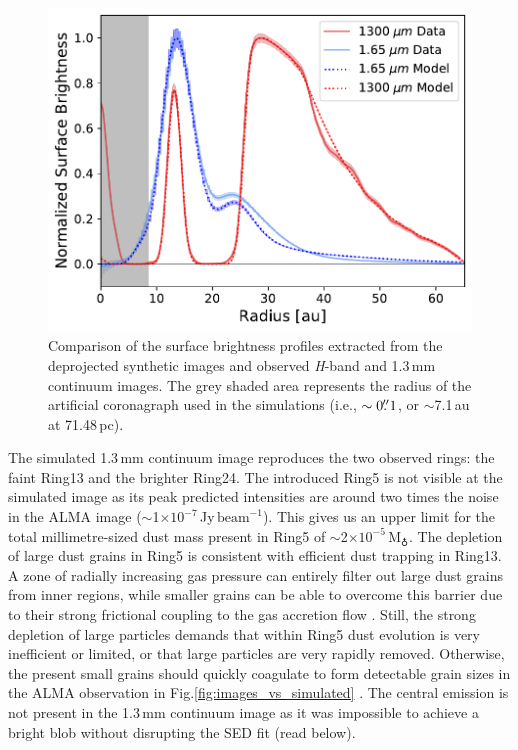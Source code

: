 \documentclass[fleqn,usenatbib,useAMS]{mnras}
\begin{document}
\begin{figure}
	\includegraphics[width=\columnwidth]{comp_fig_all_profiles_au.pdf}
    \caption{Comparison of the surface brightness profiles extracted from the deprojected synthetic images and observed \textit{H}-band and 1.3\,mm continuum images. The grey shaded area represents the radius of the artificial coronagraph used in the simulations (i.e., $\sim0\hbox{$.\!\!^{\prime\prime}$} 1$, or $\sim$7.1\,au at 71.48\,pc).}
    \label{fig:radprofiles}
\end{figure}

The simulated 1.3\,mm continuum image reproduces the two observed rings: the faint Ring13 and the brighter Ring24. The introduced Ring5 is not visible at the simulated image as its peak predicted intensities are around two times the noise in the ALMA image ($\sim$1$\times10^{-7}$\,Jy\,$\mathrm{beam}^{-1}$). This gives us an upper limit for the total millimetre-sized dust mass present in Ring5 of $\sim$2$\times10^{-5}$\,M$_{\earth}$. The depletion of large dust grains in Ring5 is consistent with efficient dust trapping in Ring13. A zone of radially increasing gas pressure can entirely filter out large dust grains from inner regions, while smaller grains can be able to overcome this barrier due to their strong frictional coupling to the gas accretion flow \citep[studied in the context of planetary gaps,][]{Rice2006,Zhu2012,Weber2018}. Still, the strong depletion of large particles demands that within Ring5 dust evolution is very inefficient or limited, or that large particles are very rapidly removed. Otherwise, the present small grains should quickly coagulate to form detectable grain sizes in the ALMA observation in Fig.\ref{fig:images_vs_simulated}  \citep{Drazkowska2019}. The central emission is not present in the 1.3\,mm continuum image as it was impossible to achieve a bright blob without disrupting the SED fit (read below).
\end{document}
